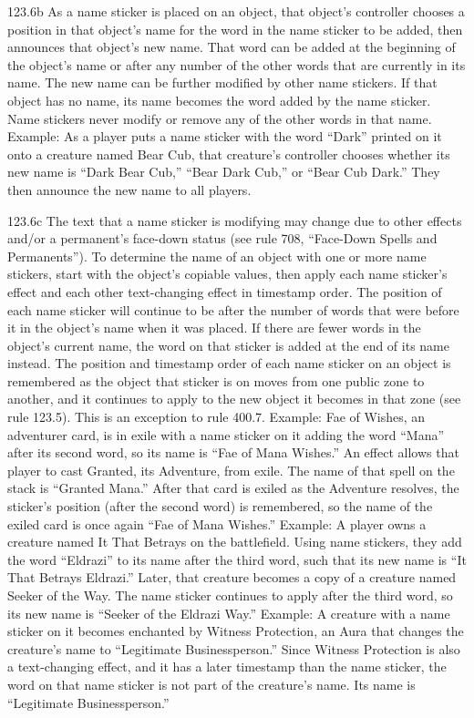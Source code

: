 123.6b As a name sticker is placed on an object, that object’s controller chooses a position in that object’s name for the word in the name sticker to be added, then announces that object’s new name. That word can be added at the beginning of the object’s name or after any number of the other words that are currently in its name. The new name can be further modified by other name stickers. If that object has no name, its name becomes the word added by the name sticker. Name stickers never modify or remove any of the other words in that name.
Example: As a player puts a name sticker with the word “Dark” printed on it onto a creature named Bear Cub, that creature’s controller chooses whether its new name is “Dark Bear Cub,” “Bear Dark Cub,” or “Bear Cub Dark.” They then announce the new name to all players.

123.6c The text that a name sticker is modifying may change due to other effects and/or a permanent’s face-down status (see rule 708, “Face-Down Spells and Permanents”). To determine the name of an object with one or more name stickers, start with the object’s copiable values, then apply each name sticker’s effect and each other text-changing effect in timestamp order. The position of each name sticker will continue to be after the number of words that were before it in the object’s name when it was placed. If there are fewer words in the object’s current name, the word on that sticker is added at the end of its name instead. The position and timestamp order of each name sticker on an object is remembered as the object that sticker is on moves from one public zone to another, and it continues to apply to the new object it becomes in that zone (see rule 123.5). This is an exception to rule 400.7.
Example: Fae of Wishes, an adventurer card, is in exile with a name sticker on it adding the word “Mana” after its second word, so its name is “Fae of Mana Wishes.” An effect allows that player to cast Granted, its Adventure, from exile. The name of that spell on the stack is “Granted Mana.” After that card is exiled as the Adventure resolves, the sticker’s position (after the second word) is remembered, so the name of the exiled card is once again “Fae of Mana Wishes.”
Example: A player owns a creature named It That Betrays on the battlefield. Using name stickers, they add the word “Eldrazi” to its name after the third word, such that its new name is “It That Betrays Eldrazi.” Later, that creature becomes a copy of a creature named Seeker of the Way. The name sticker continues to apply after the third word, so its new name is “Seeker of the Eldrazi Way.”
Example: A creature with a name sticker on it becomes enchanted by Witness Protection, an Aura that changes the creature’s name to “Legitimate Businessperson.” Since Witness Protection is also a text-changing effect, and it has a later timestamp than the name sticker, the word on that name sticker is not part of the creature’s name. Its name is “Legitimate Businessperson.”


